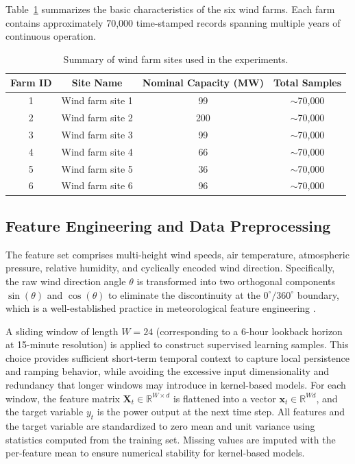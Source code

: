 Table~\ref{tab:farm_summary} summarizes the basic characteristics of the six wind farms. Each farm contains approximately 70{,}000 time-stamped records spanning multiple years of continuous operation.

\begin{table}[ht]
\centering
\caption{Summary of wind farm sites used in the experiments.}
\setlength{\tabcolsep}{4mm}
\begin{tabular}{cccc}
\toprule
Farm ID & Site Name & Nominal Capacity (MW) & Total Samples \\
\midrule
1 & Wind farm site 1 & 99  & $\sim$70{,}000 \\
2 & Wind farm site 2 & 200 & $\sim$70{,}000 \\
3 & Wind farm site 3 & 99  & $\sim$70{,}000 \\
4 & Wind farm site 4 & 66  & $\sim$70{,}000 \\
5 & Wind farm site 5 & 36  & $\sim$70{,}000 \\
6 & Wind farm site 6 & 96  & $\sim$70{,}000 \\
\bottomrule
\end{tabular}
\label{tab:farm_summary}
\end{table}


\subsection{Feature Engineering and Data Preprocessing}\label{sec:features}

The feature set comprises multi-height wind speeds, air temperature, atmospheric pressure, relative humidity, and cyclically encoded wind direction. Specifically, the raw wind direction angle $\theta$ is transformed into two orthogonal components $\sin(\theta)$ and $\cos(\theta)$ to eliminate the discontinuity at the $0^\circ/360^\circ$ boundary, which is a well-established practice in meteorological feature engineering \citep{wang2019review}.

A sliding window of length $W = 24$ (corresponding to a 6-hour lookback horizon at 15-minute resolution) is applied to construct supervised learning samples. This choice provides sufficient short-term temporal context to capture local persistence and ramping behavior, while avoiding the excessive input dimensionality and redundancy that longer windows may introduce in kernel-based models. For each window, the feature matrix $\boldsymbol{X}_t \in \mathbb{R}^{W \times d}$ is flattened into a vector $\boldsymbol{x}_t \in \mathbb{R}^{Wd}$, and the target variable $y_t$ is the power output at the next time step. All features and the target variable are standardized to zero mean and unit variance using statistics computed from the training set. Missing values are imputed with the per-feature mean to ensure numerical stability for kernel-based models.

